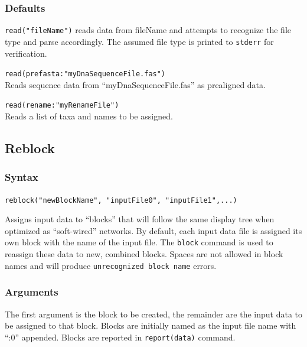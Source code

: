	\subsubsection{Defaults}
		\texttt{read("fileName")} reads data from fileName and attempts to recognize the 
		file type and parse accordingly. The assumed file type is printed to \texttt{stderr} for 
		verification.
		
	\begin{example}
		
		\item{\texttt{read(prefasta:"myDnaSequenceFile.fas")}\\ Reads sequence data from 
		``myDnaSequenceFile.fas'' as prealigned data.}
		
		\item{\texttt{read(rename:"myRenameFile")}\\ Reads a list of taxa and names to be 
		assigned.} 
		
	\end{example}
		
\subsection{Reblock}
	\subsubsection{Syntax}
		\texttt{reblock("newBlockName", "inputFile0", "inputFile1",...)}
	
	\begin{phygdescription}
	{Assigns input data to ``blocks'' that will follow the same display tree when optimized
	as ``soft-wired'' networks. By default, each input data file is assigned its own block with 
	the name of the input file. The \texttt{block} command is used to reassign these data to 
	new, combined blocks. Spaces are not allowed in block names and will produce 
	\texttt{unrecognized block name} errors.} 
	\end{phygdescription}
	
	\subsubsection{Arguments}
		The first argument is the block to be created, the remainder are the input data to 
		be assigned to that block. Blocks are initially named as the input file name with 
		``:0'' appended. Blocks are reported in \texttt{report(data)} command.
	
